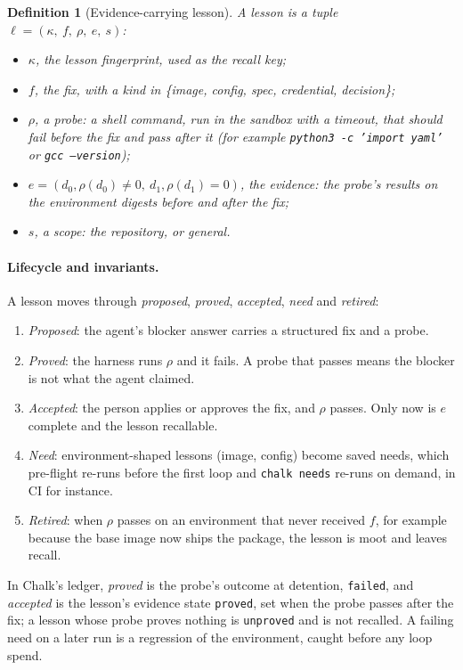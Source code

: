 \documentclass[11pt]{article}
\newtheorem{definition}{Definition}
\theoremstyle{remark}
\begin{document}
\begin{definition}[Evidence-carrying lesson]
A lesson is a tuple $\ell=(\kappa,\ f,\ \rho,\ e,\ s)$:
\begin{itemize}[leftmargin=*,nosep]
\item $\kappa$, the lesson fingerprint, used as the recall key;
\item $f$, the fix, with a kind in \{image, config, spec, credential, decision\};
\item $\rho$, a probe: a shell command, run in the sandbox with a timeout, that should fail before the fix and pass after it (for example \texttt{python3 -c 'import yaml'} or \texttt{gcc --version});
\item $e=(d_0,\rho(d_0)\neq 0,\ d_1,\rho(d_1)=0)$, the evidence: the probe's results on the environment digests before and after the fix;
\item $s$, a scope: the repository, or general.
\end{itemize}
\end{definition}

\paragraph{Lifecycle and invariants.}
A lesson moves through \emph{proposed}, \emph{proved}, \emph{accepted}, \emph{need} and \emph{retired}:
\begin{enumerate}[leftmargin=*,nosep]
\item \emph{Proposed}: the agent's blocker answer carries a structured fix and a probe.
\item \emph{Proved}: the harness runs $\rho$ and it fails. A probe that passes means the blocker is not what the agent claimed.
\item \emph{Accepted}: the person applies or approves the fix, and $\rho$ passes. Only now is $e$ complete and the lesson recallable.
\item \emph{Need}: environment-shaped lessons (image, config) become saved needs, which pre-flight re-runs before the first loop and \texttt{chalk needs} re-runs on demand, in CI for instance.
\item \emph{Retired}: when $\rho$ passes on an environment that never received $f$, for example because the base image now ships the package, the lesson is moot and leaves recall.
\end{enumerate}
In Chalk's ledger, \emph{proved} is the probe's outcome at detention, \texttt{failed}, and \emph{accepted} is the lesson's evidence state \texttt{proved}, set when the probe passes after the fix; a lesson whose probe proves nothing is \texttt{unproved} and is not recalled.
A failing need on a later run is a regression of the environment, caught before any loop spend.
\end{document}
